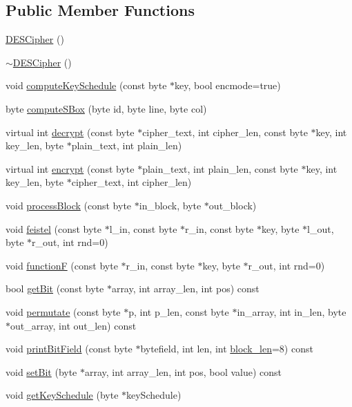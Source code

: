 \subsection*{Public Member Functions}
\begin{DoxyCompactItemize}
\item 
\hyperlink{classDESCipher_a296b6450dbdf2c35c70c74c628d9176b}{D\+E\+S\+Cipher} ()
\item 
\hyperlink{classDESCipher_ab2a6522ce5c469bfb055e1005ca03fbf}{$\sim$\+D\+E\+S\+Cipher} ()
\item 
void \hyperlink{classDESCipher_a7dc960554f1e80092e62730769b9220b}{compute\+Key\+Schedule} (const byte $\ast$key, bool encmode=true)
\item 
byte \hyperlink{classDESCipher_a5d22aac97342f530e88c8e9cf75908c2}{compute\+S\+Box} (byte id, byte line, byte col)
\item 
virtual int \hyperlink{classDESCipher_a1c4ae4be5ed99cf4278c10742cd09d02}{decrypt} (const byte $\ast$cipher\+\_\+text, int cipher\+\_\+len, const byte $\ast$key, int key\+\_\+len, byte $\ast$plain\+\_\+text, int plain\+\_\+len)
\item 
virtual int \hyperlink{classDESCipher_a61a76488e8087e92ba7f6b827c72db61}{encrypt} (const byte $\ast$plain\+\_\+text, int plain\+\_\+len, const byte $\ast$key, int key\+\_\+len, byte $\ast$cipher\+\_\+text, int cipher\+\_\+len)
\item 
void \hyperlink{classDESCipher_a97f3ae226e5a206ab35c66eef2cd6f75}{process\+Block} (const byte $\ast$in\+\_\+block, byte $\ast$out\+\_\+block)
\item 
void \hyperlink{classDESCipher_a985eafe4c2a27d27289a651ebaedd198}{feistel} (const byte $\ast$l\+\_\+in, const byte $\ast$r\+\_\+in, const byte $\ast$key, byte $\ast$l\+\_\+out, byte $\ast$r\+\_\+out, int rnd=0)
\item 
void \hyperlink{classDESCipher_a1448e493c89acc9d3dd68d1d522dd56b}{functionF} (const byte $\ast$r\+\_\+in, const byte $\ast$key, byte $\ast$r\+\_\+out, int rnd=0)
\item 
bool \hyperlink{classDESCipher_a25226668c299388dfac613b5dc6c3bac}{get\+Bit} (const byte $\ast$array, int array\+\_\+len, int pos) const
\item 
void \hyperlink{classDESCipher_a55e85a3c0fc857b378a1d3a6043ad2bb}{permutate} (const byte $\ast$p, int p\+\_\+len, const byte $\ast$in\+\_\+array, int in\+\_\+len, byte $\ast$out\+\_\+array, int out\+\_\+len) const
\item 
void \hyperlink{classDESCipher_a545d394151b622c2920f634ef2e0b9e2}{print\+Bit\+Field} (const byte $\ast$bytefield, int len, int \hyperlink{classBlockCipher_ab29ee03262fd620cd0659e860972faf0}{block\+\_\+len}=8) const
\item 
void \hyperlink{classDESCipher_aaf4fd9b18be0689fc3c9de0484dfd66c}{set\+Bit} (byte $\ast$array, int array\+\_\+len, int pos, bool value) const
\item 
void \hyperlink{classDESCipher_ace050247cc1d89cf66f85ab890e29a73}{get\+Key\+Schedule} (byte $\ast$key\+Schedule)
\end{DoxyCompactItemize}

